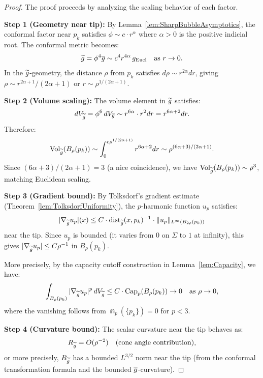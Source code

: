\begin{proof}
The proof proceeds by analyzing the scaling behavior of each factor.

\textbf{Step 1 (Geometry near tip):} By Lemma~\ref{lem:SharpBubbleAsymptotics}, the conformal factor near $p_k$ satisfies $\phi \sim c \cdot r^\alpha$ where $\alpha > 0$ is the positive indicial root. The conformal metric becomes:
\begin{equation}
    \widetilde{g} = \phi^4 \overline{g} \sim c^4 r^{4\alpha} \, g_{\mathrm{Eucl}} \quad \text{as } r \to 0.
\end{equation}
In the $\widetilde{g}$-geometry, the distance $\rho$ from $p_k$ satisfies $d\rho \sim r^{2\alpha} dr$, giving $\rho \sim r^{2\alpha+1}/(2\alpha+1)$ or $r \sim \rho^{1/(2\alpha+1)}$.

\textbf{Step 2 (Volume scaling):} The volume element in $\widetilde{g}$ satisfies:
\begin{equation}
    dV_{\widetilde{g}} = \phi^6 \, dV_{\overline{g}} \sim r^{6\alpha} \cdot r^2 dr = r^{6\alpha+2} dr.
\end{equation}
Therefore:
\begin{equation}
    \operatorname{Vol}_{\widetilde{g}}(B_\rho(p_k)) \sim \int_0^{c\rho^{1/(2\alpha+1)}} r^{6\alpha+2} dr \sim \rho^{(6\alpha+3)/(2\alpha+1)}.
\end{equation}
Since $(6\alpha+3)/(2\alpha+1) = 3$ (a nice coincidence), we have $\operatorname{Vol}_{\widetilde{g}}(B_\rho(p_k)) \sim \rho^3$, matching Euclidean scaling.

\textbf{Step 3 (Gradient bound):} By Tolksdorf's gradient estimate (Theorem~\ref{lem:TolksdorfUniformity}), the $p$-harmonic function $u_p$ satisfies:
\begin{equation}
    |\nabla_{\widetilde{g}} u_p|(x) \le C \cdot \mathrm{dist}_{\widetilde{g}}(x, p_k)^{-1} \cdot \|u_p\|_{L^\infty(B_{2\rho}(p_k))}
\end{equation}
near the tip. Since $u_p$ is bounded (it varies from $0$ on $\Sigma$ to $1$ at infinity), this gives $|\nabla_{\widetilde{g}} u_p| \le C \rho^{-1}$ in $B_\rho(p_k)$.

More precisely, by the capacity cutoff construction in Lemma~\ref{lem:Capacity}, we have:
\begin{equation}
    \int_{B_\rho(p_k)} |\nabla_{\widetilde{g}} u_p|^p \, dV_{\widetilde{g}} \le C \cdot \text{Cap}_p(B_\rho(p_k)) \to 0 \quad \text{as } \rho \to 0,
\end{equation}
where the vanishing follows from $\Cap_p(\{p_k\}) = 0$ for $p < 3$.

\textbf{Step 4 (Curvature bound):} The scalar curvature near the tip behaves as:
\begin{equation}
    R_{\widetilde{g}} = O(\rho^{-2}) \quad \text{(cone angle contribution)},
\end{equation}
or more precisely, $R_{\widetilde{g}}$ has a bounded $L^{3/2}$ norm near the tip (from the conformal transformation formula and the bounded $\overline{g}$-curvature).


\end{proof}
